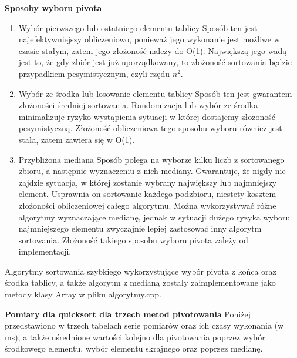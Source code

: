 \documentclass[10pt, a4paper]{article}
\begin{document}
\begin{flushleft}
\textbf{Sposoby wyboru pivota}
\begin{enumerate}
\item Wybór pierwszego lub ostatniego elementu tablicy \newline
Sposób ten jest najefektywniejszy obliczeniowo, ponieważ jego wykonanie jest możliwe w czasie stałym, zatem jego złożoność należy do O(1). Największą jego wadą jest to, że gdy zbiór jest już uporządkowany, to złożoność sortowania będzie przypadkiem pesymistycznym, czyli rzędu $n^2$.
\item Wybór ze środka lub losowanie elementu tablicy \newline
Sposób ten jest gwarantem złożoności średniej sortowania. Randomizacja lub wybór ze środka minimalizuje ryzyko wystąpienia sytuacji w której dostajemy złożoność pesymistyczną. Złożoność obliczeniowa tego sposobu wyboru również jest stała, zatem zawiera się w O(1).
\item Przybliżona mediana \newline
Sposób polega na wyborze kilku liczb z sortowanego zbioru, a następnie wyznaczeniu z nich mediany. Gwarantuje, że nigdy nie zajdzie sytuacja, w której zostanie wybrany największy lub najmniejszy element. Usprawnia on sortowanie każdego podzbioru, niestety kosztem złożoności obliczeniowej całego algorytmu. Można wykorzystywać różne algorytmy wyznaczające medianę, jednak w sytuacji dużego ryzyka wyboru najmniejszego elementu zwyczajnie lepiej zastosować inny algorytm sortowania. Złożoność takiego sposobu wyboru pivota zależy od implementacji. \newline

\end{enumerate} 

Algorytmy sortowania szybkiego wykorzystujące wybór pivota z końca oraz środka tablicy, a także algorytm z medianą zostały zaimplementowane jako metody klasy Array w pliku algorytmy.cpp. \newline
\newpage

\textbf{Pomiary dla quicksort dla trzech metod pivotowania} \newline \newline
Poniżej przedstawiono w trzech tabelach serie pomiarów oraz ich czasy wykonania (w ms), a także uśrednione wartości kolejno dla pivotowania poprzez wybór środkowego elementu, wybór elementu skrajnego oraz poprzez medianę.


\end{flushleft}
\end{document}
